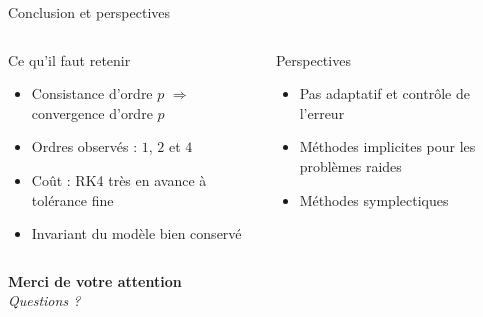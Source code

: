 \documentclass[aspectratio=169,11pt]{beamer}
\begin{document}
\begin{frame}{Conclusion et perspectives}
  \begin{columns}[T]
    \begin{block}{Ce qu'il faut retenir}
      \small
      \begin{itemize}
        \setlength{\itemsep}{0.35em}
        \item Consistance d'ordre $p$ $\Rightarrow$ convergence d'ordre $p$
        \item Ordres observés : $1$, $2$ et $4$
        \item Coût : RK4 très en avance à tolérance fine
        \item Invariant du modèle bien conservé
      \end{itemize}
    \end{block}
    \begin{block}{Perspectives}
      \small
      \begin{itemize}
        \setlength{\itemsep}{0.35em}
        \item Pas adaptatif et contrôle de l'erreur
        \item Méthodes implicites pour les problèmes raides
        \item Méthodes symplectiques
      \end{itemize}
    \end{block}
  \end{columns}
\end{frame}

\begin{frame}[plain,c]
  \centering
  {\fontsize{34}{40}\selectfont\bfseries Merci de votre attention}\\[1.2em]
  {\Large\itshape Questions ?}
\end{frame}
\end{document}
